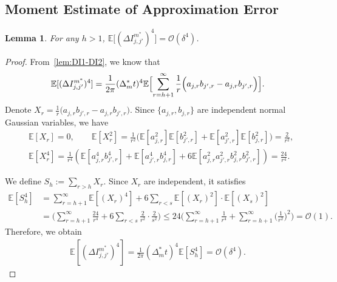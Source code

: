 \documentclass[11pt, a4paper, onecolumn]{article}
\newcommand{\E}{\mathbb{E}}
\newcommand{\ms}{{m^*}}
\newcommand{\Dms}{{\Delta^{*}_{m}}}
\newcommand{\DIjjpms}{\Delta{I_{j,j'}^{\ms}}}
\newcommand{\ajr}{a_{j,r}}
\newcommand{\ajpr}{a_{j',r}}
\newcommand{\bjr}{b_{j,r}}
\newcommand{\bjpr}{b_{j',r}}
\newcommand{\Xr}{X_r}
\newtheorem{lemma}{Lemma}
\begin{document}
\begin{appendices}
\subsection{Moment Estimate of Approximation Error}
\begin{lemma}\label{lem:DI4}
    For any $h>1$, $\E\bigl[(\DIjjpms)^4\bigr] =\mathcal{O}(\delta^{4})$.
\end{lemma}
\begin{proof}
From~\cref{lem:DI1-DI2}, we know that
\[
    \E[(\DIjjpms)^4] = \frac{1}{2\pi} (\Dms t)^4 \E\Bigl[\sum_{r=h+1}^{\infty}\frac{1}{r}\Big(a_{j,r}b_{j',r}-a_{j,r}b_{j',r}\Big)\Bigr].
\]
Denote $X_r = \frac{1}{r}\Big(a_{j,r}b_{j',r}-a_{j,r}b_{j',r}\Big)$. Since $\{\ajr,\bjr\}$ are independent normal Gaussian variables, we have
\begin{align*}
    &\E[X_r]= 0,\qquad\E[\Xr^2]  = \frac{1}{r^2} \big(\E[\ajr^2] \E[\bjpr^2] +\E[\ajpr^2] \E[\bjr^2] \bigr) = \frac{2}{r^2}, \\
    &\E[X_r^4]  = \frac{1}{r^4} \left( \E[\ajr^4 \bjpr^4] + \E[\ajpr^4 \bjr^4] + 6 \E[\ajr^2 \ajpr^2 \bjr^2 \bjpr^2] \right) = \frac{24}{r^4}.
\end{align*}

We define $S_h := \sum_{r > h}  X_r$. Since $X_r$ are independent, it satisfies
\begin{align*}
    \E[S_h^4] 
    &= \sum_{r = h+1}^\infty \E[(X_r)^4] + 6 \sum_{r < s} \E[(X_r)^2] \cdot \E[(X_s)^2] \\
    &=  \big( \sum_{r = h+1}^\infty \frac{24}{r^4} + 6 \sum_{r < s} \frac{2}{r^2} \cdot \frac{2}{s^2} \big) \le 24 \big( \sum_{r = h+1}^\infty \frac{1}{r^4} + \sum_{r=h+1}^\infty \big( \frac{1}{r^2} \big)^2 \big) = \mathcal{O}(1).
\end{align*}
Therefore, we obtain
\begin{align*}
    \E[(\DIjjpms)^4] = \frac{1}{2\pi} (\Dms t)^4 \E[S_h^4] = \mathcal{O}(\delta^4).
\end{align*}
\end{proof}


\end{appendices}
\end{document}
